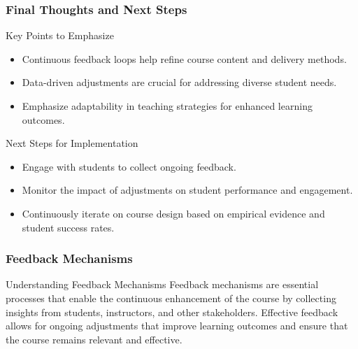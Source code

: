 \documentclass[aspectratio=169]{beamer}
\begin{document}
\begin{frame}[fragile]
    \frametitle{Final Thoughts and Next Steps}
    \begin{block}{Key Points to Emphasize}
        \begin{itemize}
            \item Continuous feedback loops help refine course content and delivery methods.
            \item Data-driven adjustments are crucial for addressing diverse student needs.
            \item Emphasize adaptability in teaching strategies for enhanced learning outcomes.
        \end{itemize}
    \end{block}

    \begin{block}{Next Steps for Implementation}
        \begin{itemize}
            \item Engage with students to collect ongoing feedback.
            \item Monitor the impact of adjustments on student performance and engagement.
            \item Continuously iterate on course design based on empirical evidence and student success rates.
        \end{itemize}
    \end{block}
\end{frame}

\begin{frame}[fragile]
    \frametitle{Feedback Mechanisms}
    \begin{block}{Understanding Feedback Mechanisms}
        Feedback mechanisms are essential processes that enable the continuous enhancement of the course by collecting insights from students, instructors, and other stakeholders. Effective feedback allows for ongoing adjustments that improve learning outcomes and ensure that the course remains relevant and effective.
    \end{block}
\end{frame}
\end{document}
